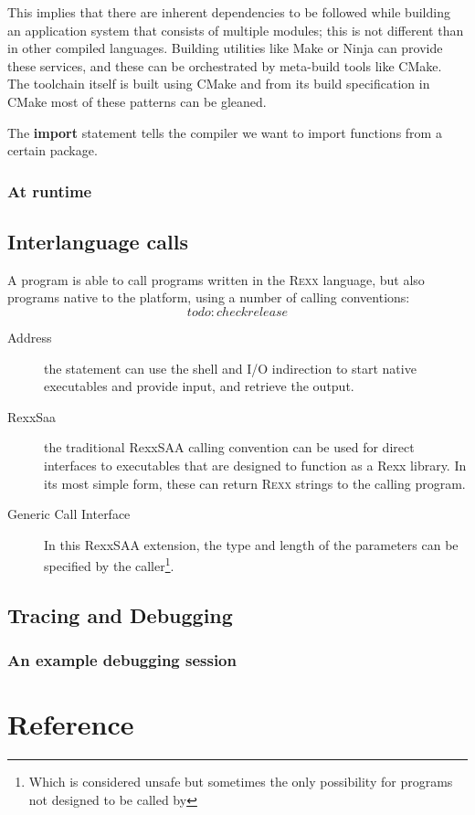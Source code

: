 This implies that there are inherent dependencies to be followed
while building an application system that consists of multiple
modules; this is not different than in other compiled
languages. Building utilities like Make or Ninja can provide these
services, and these can be orchestrated by meta-build tools like
CMake. The \crexx{} toolchain itself is built using CMake and from its
build specification in CMake most of these patterns can be gleaned.

The \textbf{import} statement\label{intraImport} tells the compiler we want to
import functions from a certain package.


\section{At runtime}
\chapter{Interlanguage calls}
A \crexx{} program is able to call programs written in the \textsc{Rexx}
language, but also programs native to the platform, using a number of
calling conventions: \[todo: checkrelease\]
\begin{description}
  \item[Address] the  statement can use the shell and
    I/O indirection to start native executables and provide input, and
    retrieve the output.
    \item[RexxSaa] the traditional RexxSAA calling convention can be
      used for direct interfaces to executables that are designed to
      function as a Rexx library. In its most simple form, these can
      return \textsc{Rexx} strings to the calling program.
      \item[Generic Call Interface] In this RexxSAA extension, the
      type and length of the parameters can be specified by the
      caller\footnote{Which is considered unsafe but sometimes the
        only possibility for programs not designed to be called by \crexx{}}.
    \end{description}
    \chapter{Tracing and Debugging}
    \section{An example debugging session}
\part{Reference}
